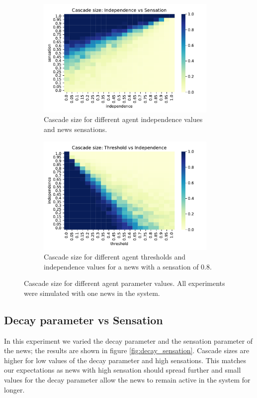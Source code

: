 \documentclass[10pt]{article}
\begin{document}
\begin{figure}
\begin{subfigure}{0.48\textwidth}
      \includegraphics[width=0.95\textwidth]{images/independence_sensation.pdf}
      \caption{Cascade size for different agent independence values and news sensations.}
      \label{fig:independence_sensation}
    \end{subfigure}\hfill
    \begin{subfigure}{0.48\textwidth}
      \centering
      \includegraphics[width=0.95\textwidth]{images/threshold_independence.pdf}
      \caption{Cascade size for different agent thresholds and independence values for a news with a sensation of 0.8.}
      \label{fig:threshold_independence}
    \end{subfigure}
    \caption{Cascade size for different agent parameter values. All experiments were simulated with one news in the system. }
    \label{fig:phase_diagrams}
\end{figure}

\subsection{Decay parameter vs Sensation}\label{subsec:decay_sensation}
In this experiment we varied the decay parameter and the sensation parameter of the news; the results are shown in figure \ref{fig:decay_sensation}. Cascade sizes are higher for low values of the decay parameter and high sensations. This matches our expectations as news with high sensation should spread further and small values for the decay parameter allow the news to remain active in the system for longer. 
\end{document}
